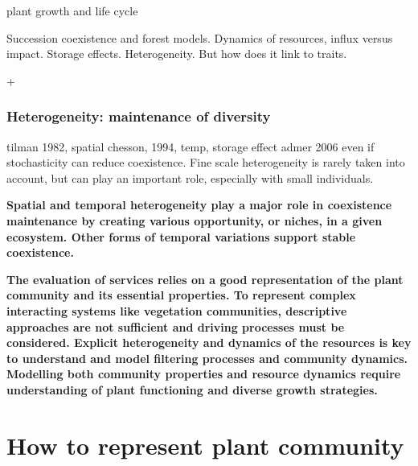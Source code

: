 plant growth and life cycle



 Succession coexistence and forest models. Dynamics of resources, influx versus impact. Storage effects. Heterogeneity. But how does it link to traits.

+ %
 
 
\subsection{Heterogeneity: maintenance of diversity}


tilman 1982, spatial
chesson, 1994, temp, 
storage effect admer 2006
even if stochasticity can reduce coexistence. Fine scale heterogeneity is rarely taken into account, but can play an important role, especially with small individuals.

\textbf{Spatial and temporal heterogeneity play a major role in coexistence maintenance by creating various opportunity, or niches, in a given ecosystem. Other forms of temporal variations support stable coexistence.}
 
 \textbf{The evaluation of services relies on a good representation of the plant community and its essential properties. To represent complex interacting systems like vegetation communities, descriptive approaches are not sufficient and driving processes must be considered. Explicit heterogeneity and dynamics of the resources is key to understand and model filtering processes and community dynamics. Modelling both community properties and resource dynamics require understanding of plant functioning and diverse growth strategies.}
 

\chapter{How to represent plant community}


